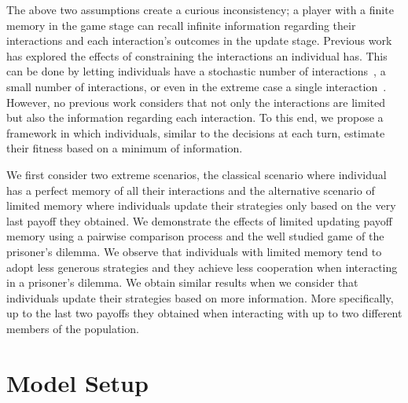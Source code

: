 \documentclass[11pt]{article}
\theoremstyle{plainCl1}
\theoremstyle{plainCl2}
\begin{document}
The above two assumptions create a curious inconsistency; a player with a finite
memory in the game stage can recall infinite information regarding their
interactions and each interaction's outcomes in the update stage. Previous work
has explored the effects of constraining the interactions an individual has.
This can be done by letting individuals have a stochastic number of
interactions~\cite{roca:PhysicalReview:2006, sanchez:JTB:2005,
Traulsen:JTB:2007}, a small number of interactions, or even in the extreme case
a single interaction~\cite{Woelfing:JTB:2009}. However, no previous work
considers that not only the interactions are limited but also the information
regarding each interaction. To this end, we propose a framework in which
individuals, similar to the decisions at each turn, estimate their fitness based
on a minimum of information.

We first consider two extreme scenarios, the classical scenario where individual
has a perfect memory of all their interactions and the alternative scenario of
limited memory where individuals update their strategies only based on the very
last payoff they obtained. We demonstrate the effects of limited updating payoff
memory using a pairwise comparison process and the well studied game of the
prisoner's dilemma. We observe that individuals with limited memory tend to
adopt less generous strategies and they achieve less cooperation when
interacting in a prisoner's dilemma. We obtain similar results when we consider
that individuals update their strategies based on more information. More
specifically, up to the last two payoffs they obtained when interacting with up
to two different members of the population.

\section{Model Setup}\label{section:model}


\end{document}
